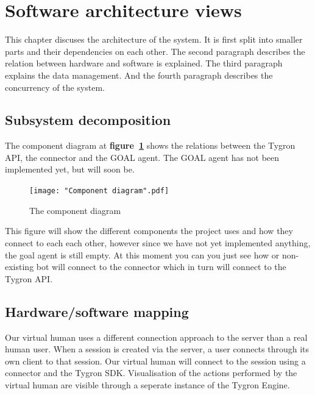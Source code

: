 \label{Software architecture views}
\section{Software architecture views}
This chapter discuses the architecture of the system. It is first split into smaller parts and their dependencies on each other. The second paragraph describes the relation between hardware and software is explained. The third paragraph explains the data management. And the fourth paragraph describes the concurrency of the system.

\subsection{Subsystem decomposition}

The component diagram at \textbf{figure~\ref{fig:comp_diag}} shows the relations between the Tygron API, the connector and the GOAL agent. The GOAL agent has not been implemented yet, but will soon be. 

\begin{figure}[h]
	  \centering
	  \texttt{[image: "Component diagram".pdf]}
	  \caption{The component diagram}
	  \label{fig:comp_diag}
\end{figure}
This figure will show the different components the project uses and how they connect to each each other, however since we have not yet implemented anything, the goal agent is still empty. At this moment you can you just see how or non-existing bot will connect to the connector which in turn will connect to the Tygron API.

\subsection{Hardware/software mapping}
Our virtual human uses a different connection approach to the server than a real human user. When a session is created via the server, a user connects through its own client to that session. Our virtual human will connect to the session using a connector and the Tygron SDK. Visualisation of the actions performed by the virtual human are visible through a seperate instance of the Tygron Engine.


